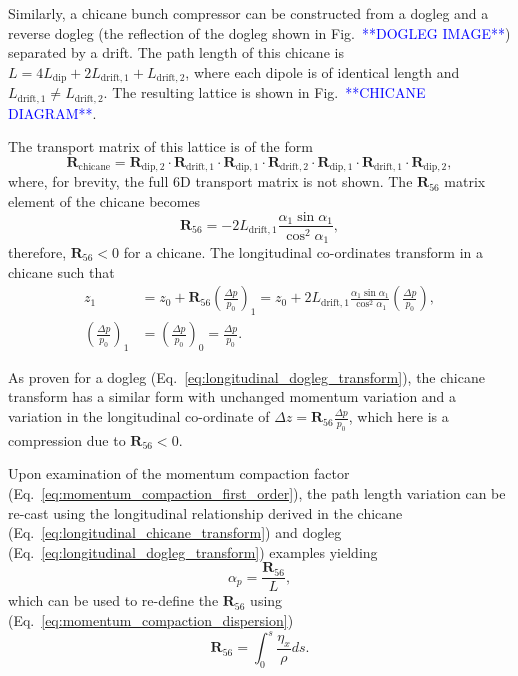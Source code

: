 \documentclass[../main.tex]{subfiles}
\begin{document}
Similarly, a chicane bunch compressor can be constructed from a dogleg and a reverse dogleg (the reflection of the dogleg shown in Fig.~\textcolor{blue}{**DOGLEG IMAGE**}) separated by a drift. The path length of this chicane is $L = 4L_{\mathrm{dip}}+2L_{\mathrm{drift,1}}+L_{\mathrm{drift,2}}$, where each dipole is of identical length and $L_{\mathrm{drift,1}}\neq L_{\mathrm{drift,2}}$. The resulting lattice is shown in Fig.~\textcolor{blue}{**CHICANE DIAGRAM**}. 

The transport matrix of this lattice is of the form
\begin{equation}
\boldsymbol{R}_{\mathrm{chicane}} = \boldsymbol{R}_{\mathrm{dip,2}}\cdot\boldsymbol{R}_{\mathrm{drift,1}}\cdot\boldsymbol{R}_{\mathrm{dip,1}}\cdot\boldsymbol{R}_{\mathrm{drift,2}}\cdot\boldsymbol{R}_{\mathrm{dip,1}}\cdot\boldsymbol{R}_{\mathrm{drift,1}}\cdot\boldsymbol{R}_{\mathrm{dip,2}},
\label{eq:chicane_transport_matrix}    
\end{equation}
where, for brevity, the full 6D transport matrix is not shown. The $\boldsymbol{R}_{56}$ matrix element of the chicane becomes
\begin{equation}
\boldsymbol{R}_{56} = -2L_{\mathrm{drift,1}}\frac{\alpha_{1}\sin\alpha_{1}}{\cos^{2}\alpha_{1}},
\label{eq:chicane_R56}    
\end{equation}
therefore, $\boldsymbol{R}_{56}<0$ for a chicane. The longitudinal co-ordinates transform in a chicane such that
\begin{align}
z_{1} &= z_{0} + \boldsymbol{R}_{56}\left(\frac{\Delta p}{p_{0}}\right)_{1} = z_{0} + 2L_{\mathrm{drift,1}}\frac{\alpha_{1}\sin\alpha_{1}}{\cos^{2}\alpha_{1}}\left(\frac{\Delta p}{p_{0}}\right), \\
\left(\frac{\Delta p}{p_{0}}\right)_{1} &= \left(\frac{\Delta p}{p_{0}}\right)_{0} = \frac{\Delta p}{p_{0}}. 
\label{eq:longitudinal_chicane_transform}    
\end{align}

As proven for a dogleg (Eq.~\ref{eq:longitudinal_dogleg_transform}), the chicane transform has a similar form with unchanged momentum variation and a variation in the longitudinal co-ordinate of $\Delta z = \boldsymbol{R}_{56}\frac{\Delta p}{p_{0}}$, which here is a compression due to $\boldsymbol{R}_{56}<0$.

Upon examination of the momentum compaction factor (Eq.~\ref{eq:momentum_compaction_first_order}), the path length variation can be re-cast using the longitudinal relationship \cite{wolski2012longitudinal} derived in the chicane (Eq.~\ref{eq:longitudinal_chicane_transform}) and dogleg (Eq.~\ref{eq:longitudinal_dogleg_transform}) examples yielding 
\begin{equation}
\alpha_{p} = \frac{\boldsymbol{R}_{56}}{L},
\label{eq:momentum_compaction_R56}
\end{equation}
which can be used to re-define the $\boldsymbol{R}_{56}$ using (Eq.~\ref{eq:momentum_compaction_dispersion})
\begin{equation}
\boldsymbol{R}_{56} = \int_{0}^{s}\frac{\eta_{x}}{\rho}ds.    
\label{eq:R56_dispersion_relation}
\end{equation}
\end{document}
